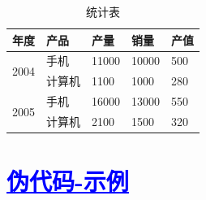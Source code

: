 
\begin{table}[htbp]
  \linespread{1.5}
  \songti
  \centering
  \caption{统计表}\label{统计表}
  \begin{tabular}{|l|l|l|l|l|}
  \hline
  年度                    & 产品  & 产量    & 销量    & 产值  \\ \hline
  \multirow{2}{*}{2004} & 手机  & 11000 & 10000 & 500 \\ \cline{2-5} 
                      & 计算机 & 1100  & 1000  & 280 \\ \hline
  \multirow{2}{*}{2005} & 手机  & 16000 & 13000 & 550 \\ \cline{2-5} 
                      & 计算机 & 2100  & 1500  & 320 \\ \hline
  \end{tabular}
\end{table}


\section{\textcolor{blue}{\underline{\underline{伪代码-示例}}}}

